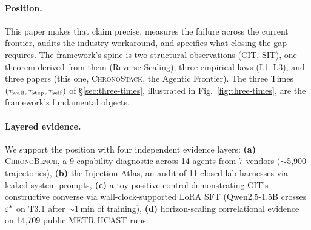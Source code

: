\paragraph{Position.}
This paper makes that claim precise, measures the failure across the current
frontier, audits the industry workaround, and specifies what closing the gap
requires. The framework's spine is two structural observations (CIT, SIT), one
theorem derived from them (Reverse-Scaling), three empirical laws (L1--L3), and
three papers (this one, \textsc{ChronoStack}, the Agentic Frontier). The three
Times $(\tau_{\mathrm{wall}}, \tau_{\mathrm{step}}, \tau_{\mathrm{self}})$ of \S\ref{sec:three-times}, illustrated in
Fig.~\ref{fig:three-times}, are the framework's fundamental objects.

\paragraph{Layered evidence.}
We support the position with four independent evidence layers: \textbf{(a)} \textsc{ChronoBench}, a 9-capability diagnostic across 14 agents from 7 vendors ($\sim$5{,}900 trajectories), \textbf{(b)} the Injection Atlas, an audit of 11 closed-lab harnesses via leaked system prompts, \textbf{(c)} a toy positive control demonstrating CIT's constructive converse via wall-clock-supported LoRA SFT (Qwen2.5-1.5B crosses $\varepsilon^{*}$ on T3.1 after $\sim$1\,min of training), \textbf{(d)} horizon-scaling correlational evidence on 14{,}709 public METR HCAST runs.

